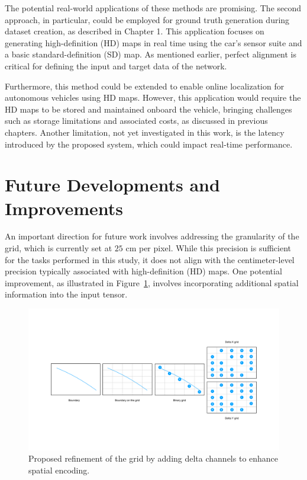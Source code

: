 The potential real-world applications of these methods are promising. The second approach, in particular, could be employed for ground truth generation during dataset creation, as described in Chapter 1. This application focuses on generating high-definition (HD) maps in real time using the car’s sensor suite and a basic standard-definition (SD) map. As mentioned earlier, perfect alignment is critical for defining the input and target data of the network.

Furthermore, this method could be extended to enable online localization for autonomous vehicles using HD maps. However, this application would require the HD maps to be stored and maintained onboard the vehicle, bringing challenges such as storage limitations and associated costs, as discussed in previous chapters. Another limitation, not yet investigated in this work, is the latency introduced by the proposed system, which could impact real-time performance.

\section{Future Developments and Improvements}

An important direction for future work involves addressing the granularity of the grid, which is currently set at $25$ cm per pixel. While this precision is sufficient for the tasks performed in this study, it does not align with the centimeter-level precision typically associated with high-definition (HD) maps. One potential improvement, as illustrated in Figure~\ref{fig:grid}, involves incorporating additional spatial information into the input tensor.

\begin{figure}[H]
    \centering
    \includegraphics[width=1\linewidth]{LateX//figs/GRID.pdf}
    \caption{Proposed refinement of the grid by adding delta channels to enhance spatial encoding.}
    \label{fig:grid}
\end{figure}

